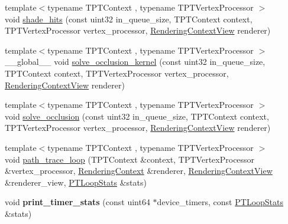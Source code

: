 \begin{DoxyCompactItemize}
{\footnotesize template$<$typename T\+P\+T\+Context , typename T\+P\+T\+Vertex\+Processor $>$ }\\void \hyperlink{group___p_t_lib_ga303934170f8bdcf0d8c674d7bc2f2513}{shade\+\_\+hits} (const uint32 in\+\_\+queue\+\_\+size, T\+P\+T\+Context context, T\+P\+T\+Vertex\+Processor vertex\+\_\+processor, \hyperlink{struct_rendering_context_view}{Rendering\+Context\+View} renderer)
\item 
{\footnotesize template$<$typename T\+P\+T\+Context , typename T\+P\+T\+Vertex\+Processor $>$ }\\\+\_\+\+\_\+global\+\_\+\+\_\+ void \hyperlink{group___p_t_lib_gafdd73db6764901e4b3f75b55362acf8b}{solve\+\_\+occlusion\+\_\+kernel} (const uint32 in\+\_\+queue\+\_\+size, T\+P\+T\+Context context, T\+P\+T\+Vertex\+Processor vertex\+\_\+processor, \hyperlink{struct_rendering_context_view}{Rendering\+Context\+View} renderer)
\item 
{\footnotesize template$<$typename T\+P\+T\+Context , typename T\+P\+T\+Vertex\+Processor $>$ }\\void \hyperlink{group___p_t_lib_ga90f55f0d6d838b4bc1a09c6682fbd709}{solve\+\_\+occlusion} (const uint32 in\+\_\+queue\+\_\+size, T\+P\+T\+Context context, T\+P\+T\+Vertex\+Processor vertex\+\_\+processor, \hyperlink{struct_rendering_context_view}{Rendering\+Context\+View} renderer)
\item 
{\footnotesize template$<$typename T\+P\+T\+Context , typename T\+P\+T\+Vertex\+Processor $>$ }\\void \hyperlink{group___p_t_lib_gadbd6e824e2ecdd07fae235bddebcd1d8}{path\+\_\+trace\+\_\+loop} (T\+P\+T\+Context \&context, T\+P\+T\+Vertex\+Processor \&vertex\+\_\+processor, \hyperlink{struct_rendering_context}{Rendering\+Context} \&renderer, \hyperlink{struct_rendering_context_view}{Rendering\+Context\+View} \&renderer\+\_\+view, \hyperlink{struct_p_t_loop_stats}{P\+T\+Loop\+Stats} \&stats)
\item 
\mbox{\label{group___p_t_lib_ga329bfd966a8af06bad3b181aacbed4d5}} 
void {\bfseries print\+\_\+timer\+\_\+stats} (const uint64 $\ast$device\+\_\+timers, const \hyperlink{struct_p_t_loop_stats}{P\+T\+Loop\+Stats} \&stats)
\end{DoxyCompactItemize}
